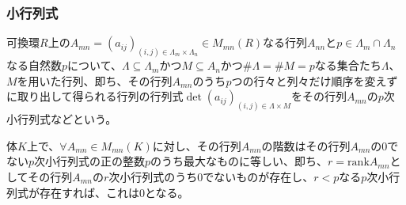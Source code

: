 \documentclass[dvipdfmx]{jsarticle}
\begin{document}
\subsubsection{小行列式}%
\begin{dfn}
可換環$R$上の$A_{mn} = \left( a_{ij} \right)_{(i,j) \in \varLambda_{m} \times \varLambda_{n}} \in M_{mn}(R)$なる行列$A_{nn}$と$p \in \varLambda_{m} \cap \varLambda_{n}$なる自然数$p$について、$\varLambda \subseteq \varLambda_{m}$かつ$M \subseteq A_{n}$かつ${\#}\varLambda = {\#}M = p$なる集合たち$\varLambda$、$M$を用いた行列、即ち、その行列$A_{mn}$のうち$p$つの行々と列々だけ順序を変えずに取り出して得られる行列の行列式$\det\left( a_{ij} \right)_{(i,j) \in \varLambda \times M}$をその行列$A_{mn}$の$p$次小行列式などという。
\end{dfn}
\begin{thm}\label{2.1.11.21}
体$K$上で、$\forall A_{mn} \in M_{mn}(K)$に対し、その行列$A_{mn}$の階数はその行列$A_{mn}$の$0$でない$p$次小行列式の正の整数$p$のうち最大なものに等しい、即ち、$r = {\mathrm{rank}}A_{mn}$としてその行列$A_{mn}$の$r$次小行列式のうち$0$でないものが存在し、$r < p$なる$p$次小行列式が存在すれば、これは$0$となる。
\end{thm}
\end{document}
